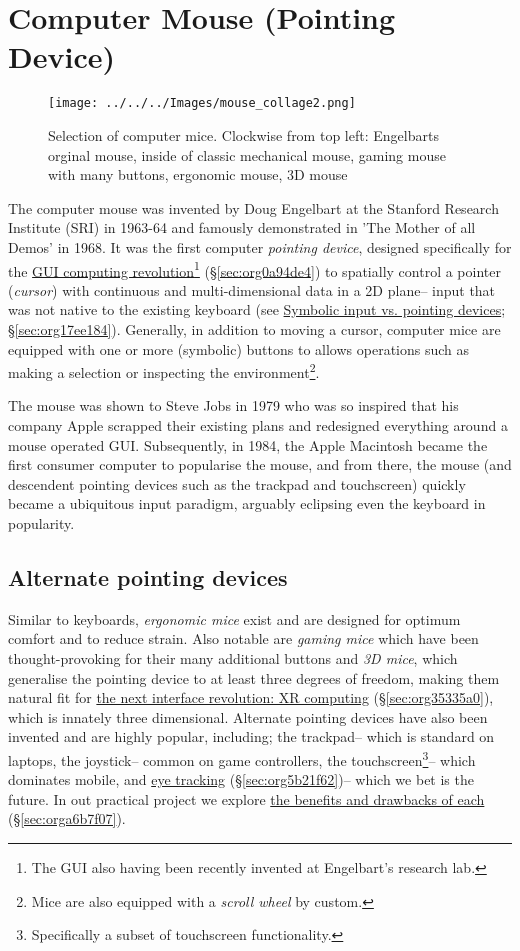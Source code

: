 \documentclass[logo,bsc,singlespacing,parskip]{infthesis}
\begin{document}
\section{Computer Mouse (Pointing Device)}
\label{sec:org25dbf37}
\begin{figure}[h]
\centering
\texttt{[image: ../../../Images/mouse\_collage2.png]}
\caption[Computer mouse collage]{Selection of computer mice. Clockwise from top left: Engelbarts orginal mouse, inside of classic mechanical mouse, gaming mouse with many buttons, ergonomic mouse, 3D mouse}
\end{figure}
The computer mouse was invented by Doug Engelbart at the Stanford Research Institute (SRI) in 1963-64 and famously demonstrated in 'The Mother of all Demos' in 1968.
It was the first computer \emph{pointing device}, designed specifically for the \hyperref[sec:org0a94de4]{GUI computing revolution}\footnote{The GUI also having been recently invented at Engelbart's research lab.} (\S \ref{sec:org0a94de4}) to spatially control a pointer (\emph{cursor}) with continuous and multi-dimensional data in a 2D plane-- input that was not native to the existing keyboard (see \hyperref[sec:org17ee184]{Symbolic input vs. pointing  devices}; \S \ref{sec:org17ee184}).
Generally, in addition to moving a cursor, computer mice are equipped with one or more (symbolic) buttons to allows operations such as making a selection or inspecting the environment\footnote{Mice are also equipped with a \emph{scroll wheel} by custom.}.

The mouse was shown to Steve Jobs in 1979 who was so inspired that his company Apple scrapped their existing plans and redesigned everything around a mouse operated GUI.
Subsequently, in 1984, the Apple Macintosh became the first consumer computer to popularise the mouse, and from there, the mouse (and descendent pointing devices such as the trackpad and touchscreen) quickly became a ubiquitous input paradigm, arguably eclipsing even the keyboard in popularity.

\subsection{Alternate pointing devices}
\label{sec:orge80a031}
Similar to keyboards, \emph{ergonomic mice} exist and are designed for optimum comfort and to reduce strain.
Also notable are \emph{gaming mice} which have been thought-provoking for their many additional buttons and \emph{3D mice}, which generalise the pointing device to at least three degrees of freedom, making them natural fit for \hyperref[sec:org35335a0]{the next interface revolution: XR computing} (\S  \ref{sec:org35335a0}), which is innately three dimensional.
Alternate pointing devices have also been invented and are highly popular, including; the trackpad-- which is standard on laptops, the joystick-- common on game controllers, the touchscreen\footnote{Specifically a subset of touchscreen functionality.}-- which dominates mobile, and \hyperref[sec:org5b21f62]{eye tracking} (\S \ref{sec:org5b21f62})-- which we bet is the future.
In out practical project we explore \hyperref[sec:orga6b7f07]{the benefits and drawbacks of each} (\S \ref{sec:orga6b7f07}).
\end{document}
